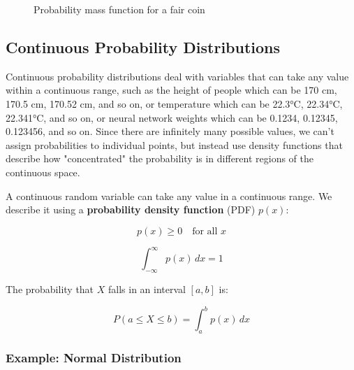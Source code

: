 \begin{figure}[h]
\centering
{}
\caption{Probability mass function for a fair coin}
\label{fig:coin-pmf}
\end{figure}

\subsection{Continuous Probability Distributions}

Continuous probability distributions deal with variables that can take any value within a continuous range, such as the height of people which can be 170 cm, 170.5 cm, 170.52 cm, and so on, or temperature which can be 22.3°C, 22.34°C, 22.341°C, and so on, or neural network weights which can be 0.1234, 0.12345, 0.123456, and so on. Since there are infinitely many possible values, we can't assign probabilities to individual points, but instead use density functions that describe how "concentrated" the probability is in different regions of the continuous space.

A continuous random variable can take any value in a continuous range. We describe it using a \textbf{probability density function} (PDF) $p(x)$:

\begin{equation}
p(x) \geq 0 \quad \text{for all } x
\end{equation}

\begin{equation}
\int_{-\infty}^{\infty} p(x) \, dx = 1
\end{equation}

The probability that $X$ falls in an interval $[a, b]$ is:

\begin{equation}
P(a \leq X \leq b) = \int_a^b p(x) \, dx
\end{equation}

\subsubsection{Example: Normal Distribution}

